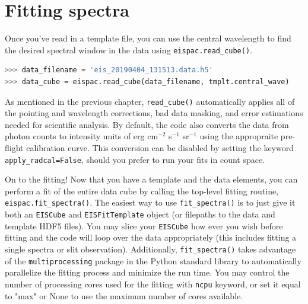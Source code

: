 \section{Fitting spectra}
Once you've read in a template file, you can use the central wavelength to find the desired spectral window in the data using \verb+eispac.read_cube()+.

\begin{lstlisting}[language=Python]
>>> data_filename = 'eis_20190404_131513.data.h5'
>>> data_cube = eispac.read_cube(data_filename, tmplt.central_wave)
\end{lstlisting}

As mentioned in the previous chapter, \verb+read_cube()+ automatically applies all of the pointing and wavelength corrections, bad data masking, and error estimations needed for scientific analysis. By default, the code also converts the data from photon counts to intensity units of erg cm$^{-2}$ s$^{-1}$ sr$^{-1}$ using the appropraite pre-flight calibration curve. This conversion can be disabled by setting the keyword \verb+apply_radcal=False+, should you prefer to run your fits in count space.

On to the fitting! Now that you have a template and the data elements, you can 
perform a fit of the entire data cube by calling the top-level fitting routine, 
\verb+eispac.fit_spectra()+. The easiest way to
use \verb+fit_spectra()+ is to just give it both an \verb+EISCube+ and 
\verb+EISFitTemplate+ object (or filepaths to the data and template HDF5 files).
You may slice your \verb+EISCube+ how ever you wish before fitting and the code 
will loop over the data appropriately (this includes fitting a single spectra or
slit observation). Additionally, \verb+fit_spectra()+ takes advantage of the 
\verb+multiprocessing+ package in the Python standard library to automatically 
parallelize the fitting process and minimize the run time. You may control the 
number of processing cores used for the fitting with \verb+ncpu+ keyword, or set
it equal to "max" or None to use the maximum number of cores 
available.

